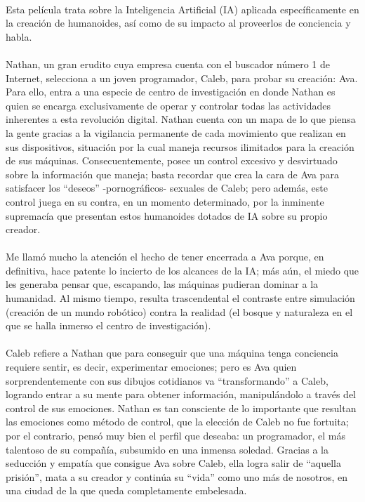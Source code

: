 \documentclass[letterpaper,12pt]{article} %
\begin{document}
    \\
	Esta película trata sobre la Inteligencia Artificial (IA) aplicada específicamente en la creación de humanoides, así como de su impacto al proveerlos de conciencia y habla.\\ \\
	Nathan, un gran erudito cuya empresa cuenta con el buscador número 1 de Internet, selecciona a un joven programador, Caleb, para probar su creación: Ava. Para ello, entra a una especie de centro de investigación en donde Nathan es quien se encarga exclusivamente de operar y controlar todas las actividades inherentes a esta revolución digital. Nathan cuenta con un mapa de lo que piensa la gente gracias a la vigilancia permanente de cada movimiento que realizan en sus dispositivos, situación por la cual maneja recursos ilimitados para la creación de sus máquinas. Consecuentemente, posee un control excesivo y desvirtuado sobre la información que maneja; basta recordar que crea la cara de Ava para satisfacer los “deseos” -pornográficos- sexuales de Caleb; pero además, este control juega en su contra, en un momento determinado, por la inminente supremacía que presentan estos humanoides dotados de IA sobre su propio creador.\\ \\
	Me llamó mucho la atención el hecho de tener encerrada a Ava porque, en definitiva, hace patente lo incierto de los alcances de la IA; más aún, el miedo que les generaba pensar que, escapando, las máquinas pudieran dominar a la humanidad. Al mismo tiempo, resulta trascendental el contraste entre simulación (creación de un mundo robótico) contra la realidad (el bosque y naturaleza en el que se halla inmerso el centro de investigación).\\ \\
	Caleb refiere a Nathan que para conseguir que una máquina tenga conciencia requiere sentir, es decir, experimentar emociones; pero es Ava quien sorprendentemente con sus dibujos cotidianos va “transformando” a Caleb, logrando entrar a su mente para obtener información, manipulándolo a través del control de sus emociones. Nathan es tan consciente de lo importante que resultan las emociones como método de control, que la elección de Caleb no fue fortuita; por el contrario, pensó muy bien el perfil que deseaba: un programador, el más talentoso de su compañía, subsumido en una inmensa soledad. Gracias a la seducción y empatía que consigue Ava sobre Caleb, ella logra salir de “aquella prisión”, mata a su creador y continúa su “vida” como uno más de nosotros, en una ciudad de la que queda completamente embelesada.\\ \\
\end{document}
